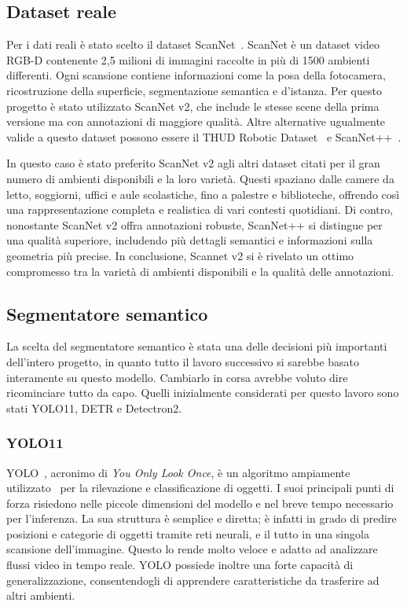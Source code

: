 \documentclass[12pt]{report}
\begin{document}
\subsection{Dataset reale}
\label{sec:dataset_reale}

Per i dati reali è stato scelto il dataset ScanNet~\cite{dai2017scannet}. ScanNet è un dataset video RGB-D contenente 2,5 milioni di immagini raccolte in più di 1500 ambienti differenti. Ogni scansione contiene informazioni come la posa della fotocamera, ricostruzione della superficie, segmentazione semantica e d'istanza. Per questo progetto è stato utilizzato ScanNet v2, che include le stesse scene della prima versione ma con annotazioni di maggiore qualità. Altre alternative ugualmente valide a questo dataset possono essere il THUD Robotic Dataset~\cite{10611489} e ScanNet++~\cite{yeshwanth2023scannethighfidelitydataset3d}.

In questo caso è stato preferito ScanNet v2 agli altri dataset citati per il gran numero di ambienti disponibili e la loro varietà. Questi spaziano dalle camere da letto, soggiorni, uffici e aule scolastiche, fino a palestre e biblioteche, offrendo così una rappresentazione completa e realistica di vari contesti quotidiani. Di contro, nonostante ScanNet v2 offra annotazioni robuste, ScanNet++ si distingue per una qualità superiore, includendo più dettagli semantici e informazioni sulla geometria più precise. In conclusione, Scannet v2 si è rivelato un ottimo compromesso tra la varietà di ambienti disponibili e la qualità delle annotazioni.

\subsection{Segmentatore semantico}
\label{sec:segmentatore_semantico}

La scelta del segmentatore semantico è stata una delle decisioni più importanti dell'intero progetto, in quanto tutto il lavoro successivo si sarebbe basato interamente su questo modello. Cambiarlo in corsa avrebbe voluto dire ricominciare tutto da capo. Quelli inizialmente considerati per questo lavoro sono stati YOLO11, DETR e Detectron2.

\subsubsection{YOLO11}
\label{sec:yolo11}

YOLO~\cite{JIANG20221066}, acronimo di \textit{You Only Look Once}, è un algoritmo ampiamente utilizzato~\cite{sultana2020review} per la rilevazione e classificazione di oggetti. I suoi principali punti di forza risiedono nelle piccole dimensioni del modello e nel breve tempo necessario per l'inferenza. La sua struttura è semplice e diretta; è infatti in grado di predire posizioni e categorie di oggetti tramite reti neurali, e il tutto in una singola scansione dell'immagine. Questo lo rende molto veloce e adatto ad analizzare flussi video in tempo reale. YOLO possiede inoltre una forte capacità di generalizzazione, consentendogli di apprendere caratteristiche da trasferire ad altri ambienti.
\end{document}
